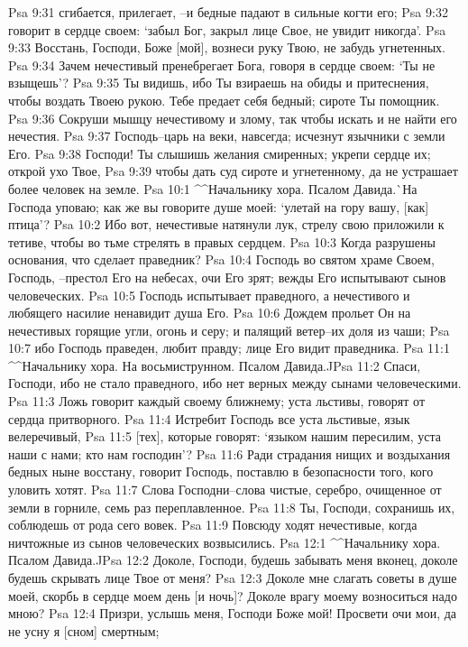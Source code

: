 Psa 9:31  сгибается, прилегает, --и бедные падают в сильные когти его;
Psa 9:32  говорит в сердце своем: `забыл Бог, закрыл лице Свое, не увидит никогда'.
Psa 9:33  Восстань, Господи, Боже [мой], вознеси руку Твою, не забудь угнетенных.
Psa 9:34  Зачем нечестивый пренебрегает Бога, говоря в сердце своем: `Ты не взыщешь'?
Psa 9:35  Ты видишь, ибо Ты взираешь на обиды и притеснения, чтобы воздать Твоею рукою. Тебе предает себя бедный; сироте Ты помощник.
Psa 9:36  Сокруши мышцу нечестивому и злому, так чтобы искать и не найти его нечестия.
Psa 9:37  Господь--царь на веки, навсегда; исчезнут язычники с земли Его.
Psa 9:38  Господи! Ты слышишь желания смиренных; укрепи сердце их; открой ухо Твое,
Psa 9:39  чтобы дать суд сироте и угнетенному, да не устрашает более человек на земле.
Psa 10:1  ^^Начальнику хора. Псалом Давида.^^ На Господа уповаю; как же вы говорите душе моей: `улетай на гору вашу, [как] птица'?
Psa 10:2  Ибо вот, нечестивые натянули лук, стрелу свою приложили к тетиве, чтобы во тьме стрелять в правых сердцем.
Psa 10:3  Когда разрушены основания, что сделает праведник?
Psa 10:4  Господь во святом храме Своем, Господь, --престол Его на небесах, очи Его зрят; вежды Его испытывают сынов человеческих.
Psa 10:5  Господь испытывает праведного, а нечестивого и любящего насилие ненавидит душа Его.
Psa 10:6  Дождем прольет Он на нечестивых горящие угли, огонь и серу; и палящий ветер--их доля из чаши;
Psa 10:7  ибо Господь праведен, любит правду; лице Его видит праведника.
Psa 11:1  ^^Начальнику хора. На восьмиструнном. Псалом Давида.^^
Psa 11:2  Спаси, Господи, ибо не стало праведного, ибо нет верных между сынами человеческими.
Psa 11:3  Ложь говорит каждый своему ближнему; уста льстивы, говорят от сердца притворного.
Psa 11:4  Истребит Господь все уста льстивые, язык велеречивый,
Psa 11:5  [тех], которые говорят: `языком нашим пересилим, уста наши с нами; кто нам господин'?
Psa 11:6  Ради страдания нищих и воздыхания бедных ныне восстану, говорит Господь, поставлю в безопасности того, кого уловить хотят.
Psa 11:7  Слова Господни--слова чистые, серебро, очищенное от земли в горниле, семь раз переплавленное.
Psa 11:8  Ты, Господи, сохранишь их, соблюдешь от рода сего вовек.
Psa 11:9  Повсюду ходят нечестивые, когда ничтожные из сынов человеческих возвысились.
Psa 12:1  ^^Начальнику хора. Псалом Давида.^^
Psa 12:2  Доколе, Господи, будешь забывать меня вконец, доколе будешь скрывать лице Твое от меня?
Psa 12:3  Доколе мне слагать советы в душе моей, скорбь в сердце моем день [и ночь]? Доколе врагу моему возноситься надо мною?
Psa 12:4  Призри, услышь меня, Господи Боже мой! Просвети очи мои, да не усну я [сном] смертным;

